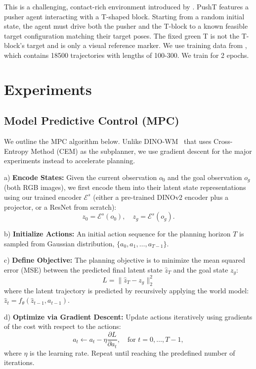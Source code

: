 This is a challenging, contact-rich environment introduced by \citet{chi2024pusht}. PushT features a pusher agent interacting with a T-shaped block. Starting from a random initial state, the agent must drive both the pusher and the T-block to a known feasible target configuration matching their target poses. The fixed green T is not the T-block’s target and is only a visual reference marker. We use training data from \citet{dinowm}, which contains 18500 trajectories with lengths of 100-300. We train for 2 epochs.

\section{Experiments}
\label{app:experiments}

\subsection{Model Predictive Control (MPC)}
\label{appendix:planning}
We outline the MPC algorithm below. Unlike DINO-WM~\citep{dinowm} that uses Cross-Entropy Method (CEM) as the subplanner, we use gradient descent for the major experiments instead to accelerate planning.

a) \textbf{Encode States:} Given the current observation $o_0$ and the goal observation $o_g$ (both RGB images), we first encode them into their latent state representations using our trained encoder $\mathcal{E}^s$ (either a pre-trained DINOv2 encoder plus a projector, or a ResNet from scratch):
$$
z_0 = \mathcal{E}^s(o_0), \quad z_g = \mathcal{E}^s(o_g).
$$

b) \textbf{Initialize Actions:} An initial action sequence for the planning horizon $T$ is sampled from Gaussian distribution, $\{a_0, a_1, \dots, a_{T-1}\}$.

c) \textbf{Define Objective:} The planning objective is to minimize the mean squared error (MSE) between the predicted final latent state $\hat{z}_T$ and the goal state $z_g$:
$$
L = \|\hat{z}_T - z_g\|_2^2
$$
where the latent trajectory is predicted by recursively applying the world model: $\hat{z}_t = f_{\theta}(\hat{z}_{t-1}, a_{t-1})$.

d) \textbf{Optimize via Gradient Descent:} Update actions iteratively using gradients of the cost with respect to the actions:
$$
a_t \leftarrow a_t - \eta \frac{\partial L}{\partial a_t}, \quad \text{for } t = 0, \dots, T-1,
$$
where $\eta$ is the learning rate. Repeat until reaching the predefined number of iterations.

